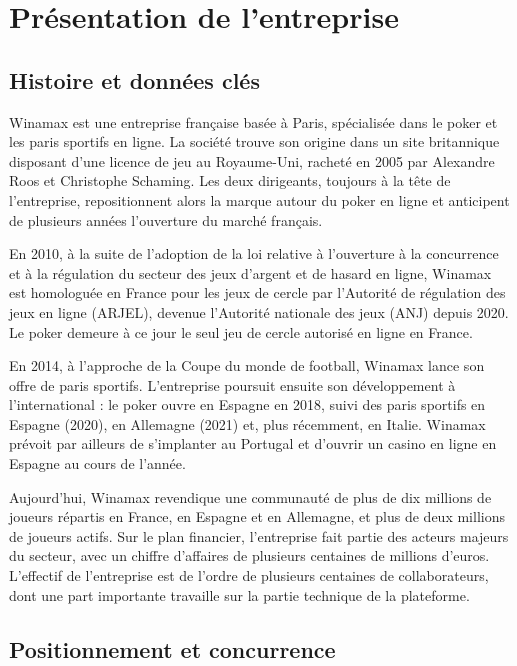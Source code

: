 \chapter{Présentation de l'entreprise}

\section{Histoire et données clés}

Winamax est une entreprise française basée à Paris, spécialisée dans le poker et les paris sportifs en
ligne. La société trouve son origine dans un site britannique disposant d'une licence de jeu au
Royaume-Uni, racheté en 2005 par Alexandre Roos et Christophe Schaming. Les deux
dirigeants, toujours à la tête de l'entreprise, repositionnent alors la marque autour du poker en ligne
et anticipent de plusieurs années l'ouverture du marché français.

En 2010, à la suite de l'adoption de la loi relative à l'ouverture à la concurrence et à la régulation du
secteur des jeux d'argent et de hasard en ligne, Winamax est homologuée en France pour les jeux de
cercle par l'Autorité de régulation des jeux en ligne (ARJEL), devenue l'Autorité nationale des jeux
(ANJ) depuis 2020. Le poker demeure à ce jour le seul jeu de cercle autorisé en ligne en France.

En 2014, à l'approche de la Coupe du monde de football, Winamax lance son offre de paris sportifs.
L'entreprise poursuit ensuite son développement à l'international : le poker ouvre en Espagne en 2018,
suivi des paris sportifs en Espagne (2020), en Allemagne (2021) et, plus récemment, en Italie. Winamax
prévoit par ailleurs de s'implanter au Portugal et d'ouvrir un casino en ligne en Espagne au cours de
l'année.


Aujourd'hui, Winamax revendique une communauté de plus de dix millions de joueurs répartis en
France, en Espagne et en Allemagne, et plus de deux millions de joueurs actifs. Sur le plan financier,
l'entreprise fait partie des acteurs majeurs du secteur, avec un chiffre d'affaires de plusieurs centaines
de millions d'euros. L'effectif de l'entreprise est de l'ordre de plusieurs centaines de collaborateurs,
dont une part importante travaille sur la partie technique de la plateforme.

\section{Positionnement et concurrence}

